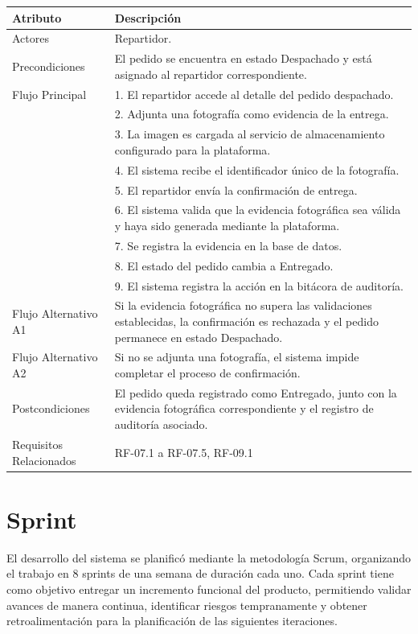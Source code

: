 \documentclass[12pt,a4paper]{report}
\begin{document}
\begin{longtable}{|p{4cm}|p{10cm}|}
\hline
\textbf{Atributo} & \textbf{Descripción} \\ \hline
Actores & Repartidor. \\ \hline
Precondiciones & El pedido se encuentra en estado Despachado y está asignado al repartidor correspondiente. \\ \hline
Flujo Principal &
1. El repartidor accede al detalle del pedido despachado.\\
& 2. Adjunta una fotografía como evidencia de la entrega.\\
& 3. La imagen es cargada al servicio de almacenamiento configurado para la plataforma.\\
& 4. El sistema recibe el identificador único de la fotografía.\\
& 5. El repartidor envía la confirmación de entrega.\\
& 6. El sistema valida que la evidencia fotográfica sea válida y haya sido generada mediante la plataforma.\\
& 7. Se registra la evidencia en la base de datos.\\
& 8. El estado del pedido cambia a Entregado.\\
& 9. El sistema registra la acción en la bitácora de auditoría. \\ \hline
Flujo Alternativo A1 & Si la evidencia fotográfica no supera las validaciones establecidas, la confirmación es rechazada y el pedido permanece en estado Despachado. \\ \hline
Flujo Alternativo A2 & Si no se adjunta una fotografía, el sistema impide completar el proceso de confirmación. \\ \hline
Postcondiciones & El pedido queda registrado como Entregado, junto con la evidencia fotográfica correspondiente y el registro de auditoría asociado. \\ \hline
Requisitos Relacionados & RF-07.1 a RF-07.5, RF-09.1 \\ \hline
\end{longtable}

\section{Sprint}
El desarrollo del sistema se planificó mediante la metodología Scrum, organizando el trabajo en 8 sprints de una semana de duración cada uno. Cada sprint tiene como objetivo entregar un incremento funcional del producto, permitiendo validar avances de manera continua, identificar riesgos tempranamente y obtener retroalimentación para la planificación de las siguientes iteraciones.
\end{document}
